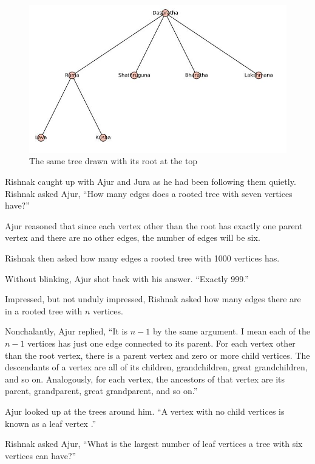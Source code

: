 \begin{figure}
\begin{center}
\includegraphics[width=\textwidth]{tree2.JPG}
\caption{The same tree drawn with its root at the top}\label{rg2}
\end{center}
\end{figure}

Rishnak caught up with Ajur and Jura as he had been following them quietly. Rishnak asked Ajur, ``How many edges does a rooted tree with seven vertices have?''

Ajur reasoned that since each vertex other than the root has exactly one parent vertex and there are no other edges, the number of edges will be six.

Rishnak then asked how many edges a rooted tree with 1000 vertices has.

Without blinking, Ajur shot back with his answer. ``Exactly 999.''

Impressed, but not unduly impressed, Rishnak asked how many edges there are in a rooted tree with $n$ vertices.

Nonchalantly, Ajur replied, ``It is $n-1$ by the same argument. I mean each of the $n-1$ vertices has just one edge connected to its parent. For each vertex other than the root vertex, there is a parent vertex and zero or more child vertices.  The descendants of a vertex are all of its children, grandchildren, great grandchildren, and so on. Analogously, for each vertex, the ancestors of that vertex are its parent, grandparent, great grandparent, and so on.''

Ajur looked up at the trees around him.  ``A vertex with no child vertices is known as a leaf vertex .''

Rishnak asked Ajur, ``What is the largest number of leaf vertices a tree with six vertices can have?''

